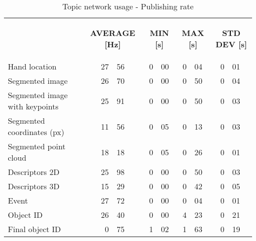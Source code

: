 \begin{table}[H]
\centering
\begin{tabular} {l r@{.}l r@{.}l r@{.}l  r@{.}l  }
\toprule
\addlinespace[3mm]
   \multicolumn{1}{c}{\begin{center}\textbf{TOPIC}\end{center}} &
   \multicolumn{2}{c}{\begin{center}\textbf{\hspace*{-0.7cm}AVERAGE [Hz]}\end{center}} &
   \multicolumn{2}{c}{\begin{center}\textbf{MIN [s]}\end{center}} &
   \multicolumn{2}{c}{\begin{center}\textbf{MAX [s]}\end{center}} &
   \multicolumn{2}{c}{\begin{center}\textbf{STD DEV [s]}\end{center}} &\\

\addlinespace[-3mm]
\midrule
 Hand location & 27&56	&	0&00	&	0&04	&  \hspace*{0.5cm}	0&01 \\
 Segmented  image &  26&70	&	0&00	&	0&50	&	0&04\\
 Segmented  image  with  keypoints & 25&91	& 	0&00	&	0&50	&	0&03 \\
 Segmented  coordinates  (px) & 11&56 	&	0&05	&	0&13	&	0&03\\
 Segmented  point  cloud & 18&18 	&	0&05	&	0&26	&	0&01\\
 Descriptors  2D & 25&98 	&	0&00	&	0&50	&	0&03\\
 Descriptors  3D & 15&29 	&	0&00	&	0&42	&	0&05\\
 Event & 27&72  	&		0&00	&	0&04	&	0&01\\
 Object ID & 26&40 		&	0&00	&	4&23	&	0&21\\
 Final  object  ID & 0&75 	&	1&02	&	1&63	&	0&19\\
\bottomrule
\end{tabular}
\caption[Topic network usage - Publishing rate]{Topic network usage - Publishing rate}
\label{hz}
\end{table}



